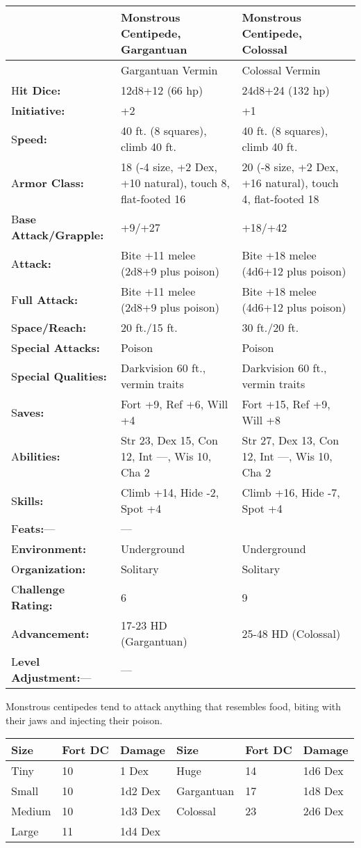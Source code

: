 \documentclass{article}
\begin{document}
\vspace{12pt}
\begin{tabular}{|>{\raggedright}p{59pt}|>{\raggedright}p{127pt}|>{\raggedright}p{127pt}|}
\hline
  & M\textbf{onstrous Centipede, Gargantuan} & M\textbf{onstrous Centipede, Colossal}\tabularnewline
\hline
  & Gargantuan Vermin & Colossal Vermin\tabularnewline
\hline
H\textbf{it Dice:} & 12d8+12 (66 hp) & 24d8+24 (132 hp)\tabularnewline
\hline
I\textbf{nitiative:} & +2 & +1\tabularnewline
\hline
S\textbf{peed:} & 40 ft. (8 squares), climb 40 ft. & 40 ft. (8 squares), climb 
40 ft.\tabularnewline
\hline
A\textbf{rmor Class:} & 18 (-4 size, +2 Dex, +10 natural), touch 8, flat-footed 
16 & 20 (-8 size, +2 Dex, +16 natural), touch 4, flat-footed 18\tabularnewline
\hline
B\textbf{ase Attack/Grapple:} & +9/+27 & +18/+42\tabularnewline
\hline
A\textbf{ttack:} & Bite +11 melee (2d8+9 plus poison) & Bite +18 melee (4d6+12 
plus poison)\tabularnewline
\hline
F\textbf{ull Attack:} & Bite +11 melee (2d8+9 plus poison) & Bite +18 melee (4d6+12 
plus poison)\tabularnewline
\hline
S\textbf{pace/Reach:} & 20 ft./15 ft. & 30 ft./20 ft.\tabularnewline
\hline
S\textbf{pecial Attacks:} & Poison & Poison\tabularnewline
\hline
S\textbf{pecial Qualities:} & Darkvision 60 ft., vermin traits & Darkvision 60 
ft., vermin traits\tabularnewline
\hline
S\textbf{aves:} & Fort +9, Ref +6, Will +4 & Fort +15, Ref +9, Will +8\tabularnewline
\hline
A\textbf{bilities:} & Str 23, Dex 15, Con 12, Int ---, Wis 10, Cha 2 & Str 27, 
Dex 13, Con 12, Int ---, Wis 10, Cha 2\tabularnewline
\hline
S\textbf{kills:} & Climb +14, Hide -2, Spot +4 & Climb +16, Hide -7, Spot +4\tabularnewline
\hline
F\textbf{eats:}--- & --- & \tabularnewline
\hline
E\textbf{nvironment:} & Underground & Underground\tabularnewline
\hline
O\textbf{rganization:} & Solitary & Solitary\tabularnewline
\hline
C\textbf{hallenge Rating:} & 6 & 9\tabularnewline
\hline
A\textbf{dvancement:} & 17-23 HD (Gargantuan) & 25-48 HD (Colossal)\tabularnewline
\hline
L\textbf{evel Adjustment:}--- & --- & \tabularnewline
\hline
\end{tabular}

Monstrous centipedes tend to attack anything that resembles food, biting with their 
jaws and injecting their poison.

\begin{tabular}{|>{\raggedright}p{32pt}|>{\raggedright}p{34pt}|>{\raggedright}p{33pt}|>{\raggedright}p{45pt}|>{\raggedright}p{34pt}|>{\raggedright}p{33pt}|}
\hline
S\textbf{ize} & F\textbf{ort DC} & D\textbf{amage} & S\textbf{ize} & F\textbf{ort 
DC} & D\textbf{amage}\tabularnewline
\hline
Tiny & 10 & 1 Dex & Huge & 14 & 1d6 Dex\tabularnewline
\hline
Small & 10 & 1d2 Dex & Gargantuan & 17 & 1d8 Dex\tabularnewline
\hline
Medium & 10 & 1d3 Dex & Colossal & 23 & 2d6 Dex\tabularnewline
\hline
Large & 11 & 1d4 Dex &  &  & \tabularnewline
\hline
\end{tabular}
\end{document}
